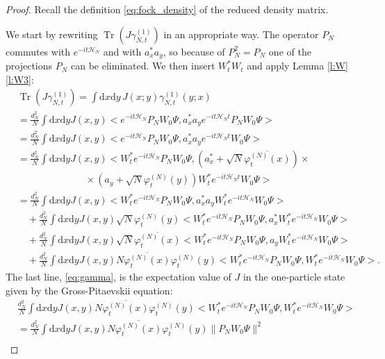 \documentclass[11pt,a4paper,DIV11]{scrartcl}	%
\newcommand{\di}{\textrm{d}}		%
\newcommand{\Hcal}{\mathcal{H}}		%
\newcommand{\scal}[2]{\big<#1,#2\big>} %
\newcommand{\cc}[1]{\overline{#1}}	%
\newcommand{\norm}[1]{\lVert#1\rVert}	%
\newcommand{\ph}{\varphi_t^{(N)}}	%
\newcommand{\Tr}{\operatorname{Tr}}	%
\newcommand{\eqr}[1]{\eqref{eq:#1}}			%
\begin{document}
\begin{proof}
Recall the definition \eqr{fock_density} of the reduced density matrix. 

We start by rewriting $\Tr\left(J \gamma_{N,t}^{(1)} \right)$ in an appropriate way. The operator $P_N$ commutes with $e^{-it \Hcal_N}$ and with $a^\ast_x a_y$, so because of $P_N^2 = P_N$ one of the projections $P_N$ can be eliminated. We then insert $W^\ast_t W_t$ and apply Lemma \ref{l:W} \ref{l:W3}:
\begin{align}
& \Tr\left(J\gamma_{N,t}^{(1)}\right) = \int \di x \di y\, J(x;y) \gamma_{N,t}^{(1)}(y;x) \nonumber\\
& = \frac{d_N^2}{N} \int \di x\di y J(x,y) \scal{e^{-it\Hcal_N}P_N W_0 \Psi}{ a^\ast_x a_y e^{-it\Hcal_N t}P_N W_0 \Psi} \nonumber\\
& = \frac{d_N^2}{N} \int \di x\di y J(x,y) \scal{e^{-it\Hcal_N}P_N W_0 \Psi}{ a^\ast_x a_y e^{-it\Hcal_N t}W_0 \Psi} \nonumber\\
& = \frac{d_N^2}{N} \int \di x\di y J(x,y) \scal{W^\ast_t e^{-it\Hcal_N}P_N W_0 \Psi}{\left(a^\ast_x + \sqrt{N} \cc{\ph(x)} \right) \times \nonumber\\
& \qquad\qquad\qquad\quad \times \left(a_y + \sqrt{N} \ph(y) \right) W^\ast_t e^{-it\Hcal_N t}W_0 \Psi} \nonumber\\
& = \frac{d_N^2}{N} \int \di x\di y J(x,y) \scal{W^\ast_t e^{-it\Hcal_N}P_N W_0 \Psi}{a^\ast_x a_y W^\ast_t e^{-it \Hcal_N} W_0 \Psi} \label{eq:quad}\\
& \quad + \frac{d_N^2}{N} \int \di x\di y J(x,y) \sqrt{N} \ph(y) \scal{W^\ast_t e^{-it\Hcal_N} P_N W_0 \Psi}{a^\ast_x W^\ast_t e^{-it \Hcal_N} W_0 \Psi} \label{eq:lin1} \\
& \quad + \frac{d_N^2}{N} \int \di x\di y J(x,y) \sqrt{N} \cc{\ph(x)} \scal{W^\ast_t e^{-it\Hcal_N}P_N W_0 \Psi}{a_y W^\ast_t e^{-it\Hcal_N} W_0 \Psi} \label{eq:lin2} \\
& \quad + \frac{d_N^2}{N} \int \di x\di y J(x,y) N \cc{\ph(x)}\ph(y) \scal{W^\ast_t e^{-it\Hcal_N} P_N W_0 \Psi}{W^\ast_t e^{-it\Hcal_N} W_0 \Psi}. \label{eq:gamma}
\end{align}
The last line, \eqref{eq:gamma}, is the expectation value of $J$ in the one-particle state given by the Gross-Pitaevskii equation:
\begin{align*}
& \frac{d_N^2}{N} \int \di x\di y J(x,y) N \cc{\ph(x)}\ph(y) \scal{W^\ast_t e^{-it\Hcal_N} P_N W_0 \Psi}{W^\ast_t e^{-it\Hcal_N} W_0 \Psi} \\
& = \frac{d_N^2}{N} \int \di x\di y J(x,y) N \cc{\ph(x)}\ph(y) \norm{P_N W_0 \Psi}^2 \\

\end{align*}
\end{proof}
\end{document}
